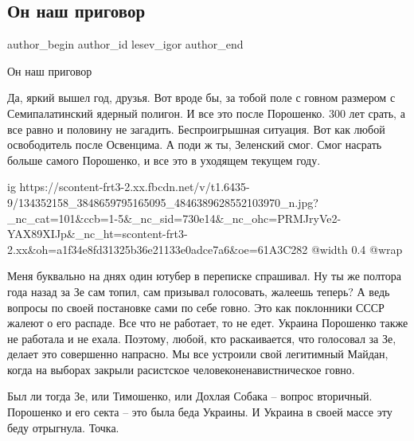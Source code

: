  
 
 
 
 
 
\subsection{Он наш приговор}
\label{sec:31_12_2020.fb.lesev_igor.1.on_nash_prigovor}
 
\ifcmt
 author_begin
   author_id lesev_igor
 author_end
\fi

Он наш приговор

Да, яркий вышел год, друзья. Вот вроде бы, за тобой поле с говном размером с
Семипалатинский ядерный полигон. И все это после Порошенко. 300 лет срать, а
все равно и половину не загадить. Беспроигрышная ситуация. Вот как любой
освободитель после Освенцима. А поди ж ты, Зеленский смог. Смог насрать больше
самого Порошенко, и все это в уходящем текущем году.

\ifcmt
  ig https://scontent-frt3-2.xx.fbcdn.net/v/t1.6435-9/134352158_3848659795165095_4846389628552103970_n.jpg?_nc_cat=101&ccb=1-5&_nc_sid=730e14&_nc_ohc=PRMJryVe2-YAX89XIJp&_nc_ht=scontent-frt3-2.xx&oh=a1f34e8fd31325b36e21133e0adce7a6&oe=61A3C282
  @width 0.4
  @wrap 
\fi

Меня буквально на днях один ютубер в переписке спрашивал. Ну ты же полтора года
назад за Зе сам топил, сам призывал голосовать, жалеешь теперь? А ведь вопросы
по своей постановке сами по себе говно. Это как поклонники СССР жалеют о его
распаде. Все что не работает, то не едет. Украина Порошенко также не работала и
не ехала. Поэтому, любой, кто раскаивается, что голосовал за Зе, делает это
совершенно напрасно. Мы все устроили свой легитимный Майдан, когда на выборах
закрыли расистское человеконенавистническое говно.

Был ли тогда Зе, или Тимошенко, или Дохлая Собака – вопрос вторичный. Порошенко
и его секта – это была беда Украины. И Украина в своей массе эту беду
отрыгнула. Точка.

